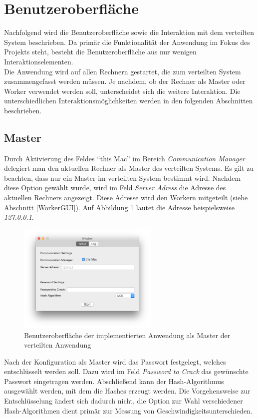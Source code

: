 \section{Benutzeroberfläche}
Nachfolgend wird die Benutzeroberfläche sowie die Interaktion mit dem verteilten System beschrieben. Da primär die Funktionalität der Anwendung im Fokus des Projekts steht, besteht die Benutzeroberfläche aus nur wenigen Interaktionselementen. \\
Die Anwendung wird auf allen Rechnern gestartet, die zum verteilten System zusammengefasst werden müssen. Je nachdem, ob der Rechner als Master oder Worker verwendet werden soll, unterscheidet sich die weitere Interaktion. Die unterschiedlichen Interaktionsmöglichkeiten werden in den folgenden Abschnitten beschrieben. 

\subsection{Master}
Durch Aktivierung des Feldes \enquote{this Mac} im Bereich \emph{Communication Manager} delegiert man den aktuellen Rechner als Master des verteilten Systems. Es gilt zu beachten, dass nur ein Master im verteilten System bestimmt wird. Nachdem diese Option gewählt wurde, wird im Feld \emph{Server Adress} die Adresse des aktuellen Rechners angezeigt. Diese Adresse wird den Workern mitgeteilt (siehe Abschnitt \ref{WorkerGUI}). Auf Abbildung \ref{fig:WindowMaster} lautet die Adresse beispielsweise \emph{127.0.0.1}. \\
\begin{figure}[!ht]
	\centering
		\includegraphics[natwidth=1200pt, natheight=349pt, width=0.6\textwidth]{images/WindowMaster.png}
		\caption{Benutzeroberfläche der implementierten Anwendung als Master der verteilten Anwendung}
	\label{fig:WindowMaster}
\end{figure}
Nach der Konfiguration als Master wird das Passwort festgelegt, welches entschlüsselt werden soll. Dazu wird im Feld \emph{Password to Crack} das gewünschte Passwort eingetragen werden. Abschließend kann der Hash-Algorithmus ausgewählt werden, mit dem die Hashes erzeugt werden. Die Vorgehensweise zur Entschlüsselung ändert sich dadurch nicht, die Option zur Wahl verschiedener Hash-Algorithmen dient primär zur Messung von Geschwindigkeitsunterschieden. \\

